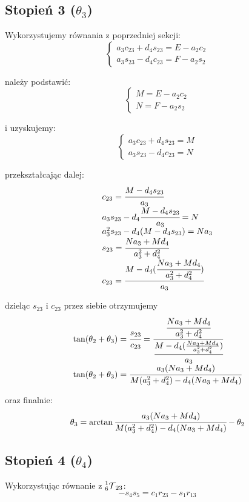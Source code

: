 \documentclass[]{article}
\newcommand\T{\mathcal{T}}
\begin{document}
\subsection{Stopień 3 ($\theta_3$)}
Wykorzystujemy równania z poprzedniej sekcji:
\[\left\{\begin{array}{l}
a_3c_{23} + d_4s_{23} = E - a_2c_2 \\
a_3s_{23} - d_4c_{23} = F - a_2s_2
\end{array}\right.\]

należy podstawić:
\[\left\{\begin{array}{l}
M = E - a_2c_2 \\
N = F - a_2s_2
\end{array}\right.\]

i uzyskujemy:
\[\left\{\begin{array}{l}
a_3c_{23} + d_4s_{23} = M \\
a_3s_{23} - d_4c_{23} = N
\end{array}\right.\]

przekształcając dalej:
\[\begin{array}{l}
c_{23} = \cfrac{M - d_4s_{23}}{a_3} \\
a_3s_{23} - d_4\cfrac{M - d_4s_{23}}{a_3} = N \\
a_3^2s_{23} - d_4(M - d_4s_{23}) = Na_3 \\
s_{23} = \cfrac{Na_3 + Md_4}{a_3^2 + d_4^2} \\
c_{23} = \cfrac{M - d_4(\cfrac{Na_3 + Md_4}{a_3^2 + d_4^2})}{a_3}
\end{array}\]

dzieląc $s_{23}$ i $c_{23}$ przez siebie otrzymujemy
\[\begin{array}{l}
\tan(\theta_2 + \theta_3) = \cfrac{s_{23}}{c_{23}} = \cfrac{\cfrac{Na_3 + Md_4}{a_3^2 + d_4^2}}{\cfrac{M - d_4(\frac{Na_3 + Md_4}{a_3^2 + d_4^2})}{a_3}} \\
\tan(\theta_2 + \theta_3) = \cfrac{a_3(Na_3 + Md_4)}{M(a_3^2 + d_4^2) - d_4(Na_3 + Md_4)} \\
\end{array}\]

oraz finalnie:
\[
\theta_3 = \arctan{\cfrac{a_3(Na_3 + Md_4)}{M(a_3^2 + d_4^2) - d_4(Na_3 + Md_4)}} - \theta_2
\]

\subsection{Stopień 4 ($\theta_4$)}
Wykorzystując równanie z $\prescript{1}{6}{\T}_{23}$:
\[
- s_4s_5 = c_1r_{23} - s_1r_{13}
\]
\end{document}
